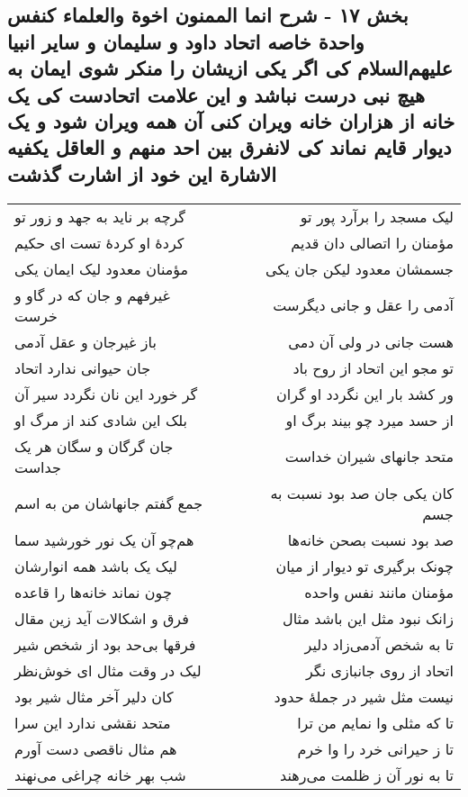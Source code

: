 \begin{center}
\section*{بخش ۱۷ - شرح انما الممنون اخوة والعلماء کنفس واحدة خاصه اتحاد داود و سلیمان و سایر انبیا علیهم‌السلام کی اگر یکی ازیشان را منکر شوی ایمان به هیچ نبی درست نباشد و این علامت اتحادست کی یک خانه از هزاران خانه ویران کنی آن همه ویران شود و یک دیوار قایم نماند کی لانفرق بین احد منهم و العاقل یکفیه الاشارة این خود از اشارت گذشت}
\label{sec:sh017}
\begin{longtable}{l p{0.5cm} r}
گرچه بر ناید به جهد و زور تو
&&
لیک مسجد را برآرد پور تو
\\
کردهٔ او کردهٔ تست ای حکیم
&&
مؤمنان را اتصالی دان قدیم
\\
مؤمنان معدود لیک ایمان یکی
&&
جسمشان معدود لیکن جان یکی
\\
غیرفهم و جان که در گاو و خرست
&&
آدمی را عقل و جانی دیگرست
\\
باز غیرجان و عقل آدمی
&&
هست جانی در ولی آن دمی
\\
جان حیوانی ندارد اتحاد
&&
تو مجو این اتحاد از روح باد
\\
گر خورد این نان نگردد سیر آن
&&
ور کشد بار این نگردد او گران
\\
بلک این شادی کند از مرگ او
&&
از حسد میرد چو بیند برگ او
\\
جان گرگان و سگان هر یک جداست
&&
متحد جانهای شیران خداست
\\
جمع گفتم جانهاشان من به اسم
&&
کان یکی جان صد بود نسبت به جسم
\\
هم‌چو آن یک نور خورشید سما
&&
صد بود نسبت بصحن خانه‌ها
\\
لیک یک باشد همه انوارشان
&&
چونک برگیری تو دیوار از میان
\\
چون نماند خانه‌ها را قاعده
&&
مؤمنان مانند نفس واحده
\\
فرق و اشکالات آید زین مقال
&&
زانک نبود مثل این باشد مثال
\\
فرقها بی‌حد بود از شخص شیر
&&
تا به شخص آدمی‌زاد دلیر
\\
لیک در وقت مثال ای خوش‌نظر
&&
اتحاد از روی جانبازی نگر
\\
کان دلیر آخر مثال شیر بود
&&
نیست مثل شیر در جملهٔ حدود
\\
متحد نقشی ندارد این سرا
&&
تا که مثلی وا نمایم من ترا
\\
هم مثال ناقصی دست آورم
&&
تا ز حیرانی خرد را وا خرم
\\
شب بهر خانه چراغی می‌نهند
&&
تا به نور آن ز ظلمت می‌رهند

\end{longtable}
\end{center}
